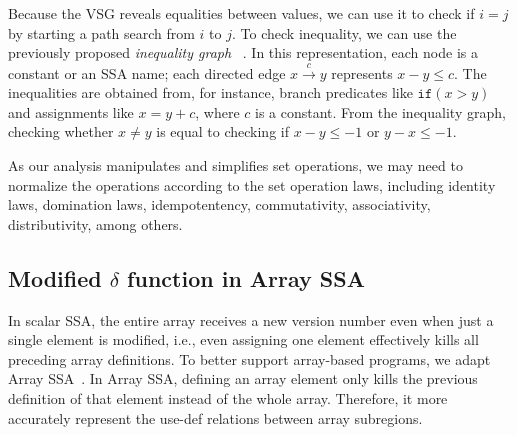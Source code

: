 Because the VSG reveals equalities between values, we can use it to check if $i=j$ by starting a path search from $i$ to $j$. 
To check inequality, we can use the previously proposed \emph{inequality graph} ~\cite{ABCD}.
In this representation, each node is a constant or an SSA name;
each directed edge $x \xrightarrow{c} y$ represents $x-y\le c$. 
The inequalities are obtained from, for instance, branch predicates like $\texttt{if}(x>y)$ and assignments like $x = y + c$, where $c$ is a constant. 
From the inequality graph, checking whether $x \ne y$ is equal to checking if $x-y\le -1$ or $y-x\le -1$.

As our analysis manipulates and simplifies set operations, we may need to normalize the operations according to the set operation laws, including identity laws, domination laws, idempotentency, commutativity, associativity, distributivity, among others.



\subsection{Modified $\delta$ function in Array SSA}
\label{modified-ssa}


In scalar SSA, the entire array receives a new version number even when just a single element is modified, i.e., even assigning one element effectively kills all preceding array definitions.
To better support array-based programs, we adapt Array SSA~\cite{rus2006scalable}.
In Array SSA, defining an array element only kills the previous definition of that element instead of the whole array. 
Therefore, it more accurately represent the use-def relations between array subregions. 

